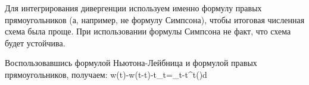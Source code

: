 \documentclass[main.tex]{subfiles}
\begin{document}
Для интегрирования дивергенции используем именно формулу правых прямоугольников (а, например, не формулу Симпсона), чтобы итоговая численная схема была проще.
При использовании формулы Симпсона не факт, что схема будет устойчива.

Воспользовавшись формулой Ньютона-Лейбница и формулой правых прямоугольников, получаем:
\beq
w(t)-w(t-\Delta t)-\Delta t_t=\int\limits_{t-\Delta t}^{t}{\varphi(\tau)d\tau}
\eeq
\end{document}

